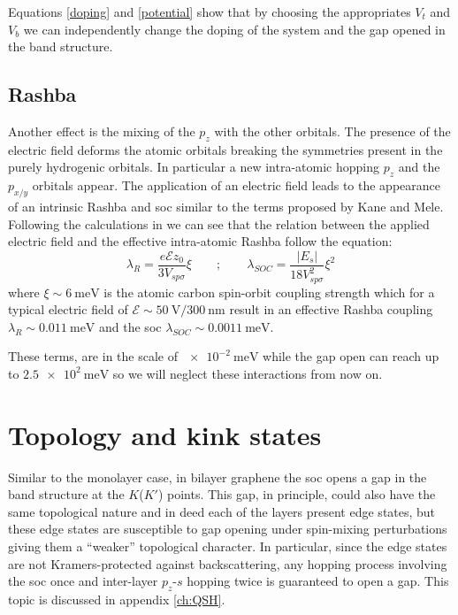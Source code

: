 Equations \eqref{doping} and \eqref{potential} show that by choosing the        appropriates $V_t$ and $V_b$ we can independently change the doping of the      system and the gap opened in the band structure.





\subsection{Rashba}
Another effect is the mixing of the $p_z$ with the other orbitals. The presence of the electric field deforms the atomic orbitals breaking the symmetries present in the purely hydrogenic orbitals. In particular a new intra-atomic hopping $p_z$ and the $p_{x/y}$ orbitals appear. The application of an electric field leads to the appearance of an intrinsic Rashba and \ac{soc} similar to the terms proposed by Kane and Mele\cite{Kane2005}.
Following the calculations in %
\cite{Min2006} we can see that the relation between the applied electric field and the effective intra-atomic Rashba follow the equation:
\begin{equation}
   \lambda_R=\frac{e\mathcal{E}z_0}{3V_{sp\sigma}}\xi \qquad;\qquad
   \lambda_{SOC}=\frac{|E_{s}|}{18V^2_{sp\sigma}}\xi^2
\label{rashba}
\end{equation}
where $\xi\sim\SI{6}{\meV}$ is the atomic carbon spin-orbit coupling strength
which for a typical electric field of $\mathcal{E}\sim\SI{50}{\V}/\SI{300}{\nm}$ result in an effective Rashba coupling $\lambda_R\sim\SI{0.011}{\meV}$ and the \ac{soc} $\lambda_{SOC}\sim\SI{0.0011}{\meV}$.

These terms, are in the scale of $\SI{e-2}{\meV}$ while the gap open can reach up to $\SI{2.5e2}{\meV}$ so we will neglect these interactions from now on.


\section{Topology and kink states}
Similar to the monolayer case, in bilayer graphene the \ac{soc} opens a gap in the band structure at the $K$($K'$) points. This gap, in principle, could also have the same topological nature and in deed each of the layers present edge states, but these edge states are susceptible to gap opening under spin-mixing perturbations\cite{Prada2011} giving them a ``weaker'' topological character. In particular, since the edge states are not Kramers-protected against backscattering, any hopping process involving the \ac{soc} once and inter-layer $p_z$-$s$ hopping twice is guaranteed to open a gap. This topic is discussed in appendix \ref{ch:QSH}.
\smallskip


